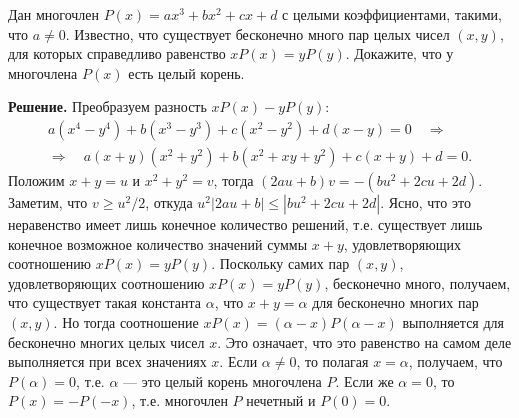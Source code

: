 Дан многочлен $P(x)=ax^3+bx^2+cx+d$ с целыми коэффициентами, такими, что
$a\neq 0$. Известно, что существует бесконечно много пар целых чисел
$(x,y)$, для которых справедливо равенство $xP(x)=yP(y)$. Докажите, что
у многочлена $P(x)$ есть целый корень.

\textbf{Решение.}
Преобразуем разность $xP(x)-yP(y)$: $$\begin{gathered}
a(x^4-y^4)+b(x^3-y^3)+c(x^2-y^2)+d(x-y)=0\quad\Longrightarrow \\ \Longrightarrow\quad a(x+y)(x^2+y^2)+b(x^2+xy+y^2)+c(x+y)+d=0.    \end{gathered}$$
Положим $x+y=u$ и $x^2+y^2=v$, тогда $(2au+b)v=-(bu^2+2cu+2d)$. Заметим,
что $v\geq u^2/2$, откуда $u^2|2au+b|\leq |bu^2+2cu+2d|$. Ясно, что это
неравенство имеет лишь конечное количество решений, т.е. существует лишь
конечное возможное количество значений суммы $x+y$, удовлетворяющих
соотношению $xP(x)=yP(y)$. Поскольку самих пар $(x,y)$, удовлетворяющих
соотношению $xP(x)=yP(y)$, бесконечно много, получаем, что существует
такая константа $\alpha$, что $x+y=\alpha$ для бесконечно многих пар
$(x,y)$. Но тогда соотношение $xP(x)=(\alpha-x)P(\alpha-x)$ выполняется
для бесконечно многих целых чисел $x$. Это означает, что это равенство
на самом деле выполняется при всех значениях $x$. Если $\alpha\neq 0$,
то полагая $x=\alpha$, получаем, что $P(\alpha)=0$, т.е. $\alpha$ — это
целый корень многочлена $P$. Если же $\alpha=0$, то $P(x)=-P(-x)$, т.е.
многочлен $P$ нечетный и $P(0)=0$.
